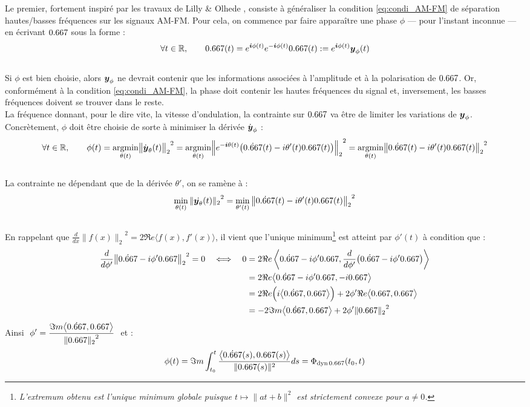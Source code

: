 Le premier, fortement inspiré par les travaux de Lilly \& Olhede  \cite{lilly_analysis_2012}, consiste à généraliser la condition \eqref{eq:condi_AM-FM} de séparation hautes/basses fréquences sur les signaux AM-FM.
Pour cela, on commence par faire apparaître une phase $\phi$ --- pour l'instant inconnue --- en écrivant $\x$ sous la forme :
\[\forall t\in\R,\qquad \x(t) = e^{\i \phi(t)} e^{-\i \phi(t)} \x(t) \defeq e^{\i \phi(t)} \bf{y}_\phi(t)\]
\\
Si $\phi$ est bien choisie, alors $\bf{y}_\phi$ ne devrait contenir que les informations associées à l'amplitude et à la polarisation de $\x$. Or, conformément à la condition \eqref{eq:condi_AM-FM}, la phase doit contenir les hautes fréquences du signal et, inversement, les basses fréquences doivent se trouver dans le reste. 
\\
La fréquence donnant, pour le dire vite, la vitesse d'ondulation, la contrainte sur $\x$ va être de limiter les variations de  $\bf{y}_\phi$. Concrètement, $\phi$ doit être choisie de sorte à minimiser la dérivée $\dot{\bf{y}}_\phi$ :
\[\forall t\in\R,\qquad \phi(t) = \argmin{\theta(t)}{\big\|\dot{\bf{y}}_\theta(t)\big\|_2}^2 = \argmin{\theta(t)}{\Big\|e^{-\i \theta(t)}\big(\dot{\x}(t) - i\theta'(t) \x(t)\big) \Big\|_2}^2 = \argmin{\theta(t)}{\big\|\dot{\x}(t) - i\theta'(t)\x(t)\big\|_2}^2\]
\\
La contrainte ne dépendant que de la dérivée $\theta'$, on se ramène à :
\[\min_{\theta(t)}{\|\dot{\bf{y}_\theta}(t)\|_2}^2 = \min_{\theta'(t)}{\big\|\dot{\x}(t) - i\theta'(t) \x(t)\big\|_2}^2\]
\\
En rappelant que $\frac{d}{dx}{\big\|f(x)\big\|_2}^2 = 2\Re e\big\langle f(x), f'(x)\big\rangle$, il vient que l'unique minimum\footnote{\itshape
	L'extremum obtenu est l'unique minimum globale puisque $t\longmapsto \|at + b\|^2$ est strictement convexe pour $a\neq0$.}
est atteint par $\phi'(t)$ à condition que :
\begin{align*}
	\frac{d}{d\phi'}{\big\| \dot{\x} - i\phi' \x\big\|_2}^2 = 0 \quad \Llr\quad
	0 &= 2\Re e\left\langle  \dot{\x} - i\phi' \x ,  \frac{d}{d\phi'}\big(\dot{\x} - i\phi' \x\big)\right\rangle \\
	&= 2\Re e\big\langle  \dot{\x} - i\phi' \x ,  - i \x\big\rangle \\
	&= 2\Re e\Big(i\big\langle  \dot{\x} ,  \x\big\rangle\Big) + 2\phi'\Re e\big\langle   \x ,  \x\big\rangle\\
	&= -2\Im m\big\langle  \dot{\x} ,  \x\big\rangle + 2\phi'{\| \x\|_2}^2
\end{align*}
Ainsi $\displaystyle \ \phi' = \frac{\Im m\big\langle \dot{\x} ,  \x\big\rangle}{{\| \x\|_2}^2}\ $ et :
\begin{equation}\label{eq:phas_inst_v1}
	\phi(t) = \Im m\int_{t_0}^t \frac{\big\langle \dot{\x}(s) , \x(s) \big\rangle}{\|\x(s)\|^2} ds = \phased[\x](t_0,t)
\end{equation}
\skipl




